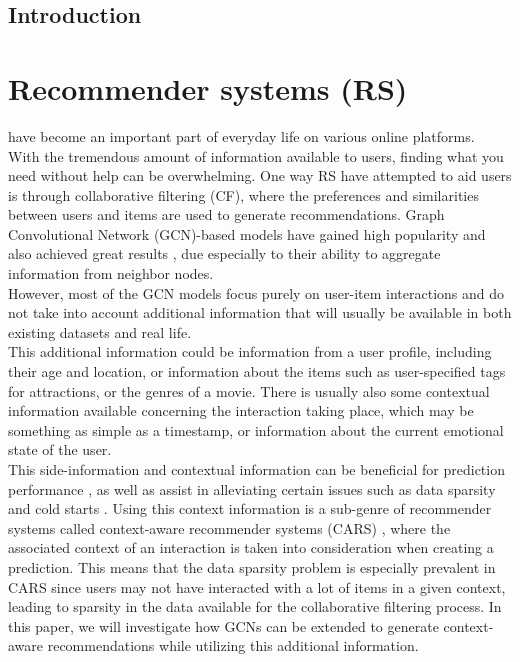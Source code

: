 \noindent
\section{Introduction}
\chapter{Recommender systems (RS)}\label{ch:introduction}
have become an important part of everyday life on various online platforms.
\\
With the tremendous amount of information available to users, finding what you need without help can be overwhelming.
One way RS have attempted to aid users is through collaborative filtering (CF), where the preferences and similarities between users and items are used to generate recommendations. 
Graph Convolutional Network (GCN)-based models have gained high popularity and also achieved great results \cite{NGCF,LightGCN,KGAT}, due especially to their ability to aggregate information from neighbor nodes.\\
However, most of the GCN models focus purely on user-item interactions and do not take into account additional information that will usually be available in both existing datasets and real life.
\\
This additional information could be information from a user profile, including their age and location, or information about the items such as user-specified tags for attractions, or the genres of a movie.
There is usually also some contextual information available concerning the interaction taking place, which may be something as simple as a timestamp, or information about the current emotional state of the user.\\
This side-information and contextual information can be beneficial for prediction performance \cite{ContextImportance2}, as well as assist in alleviating certain issues such as data sparsity and cold starts \cite{SideInfoDefinition}.
Using this context information is a sub-genre of recommender systems called context-aware recommender systems (CARS) \cite{carsprogress}, where the associated context of an interaction is taken into consideration when creating a prediction.
This means that the data sparsity problem is especially prevalent in CARS since users may not have interacted with a lot of items in a given context, leading to sparsity in the data available for the collaborative filtering process.
In this paper, we will investigate how GCNs can be extended to generate context-aware recommendations while utilizing this additional information.
